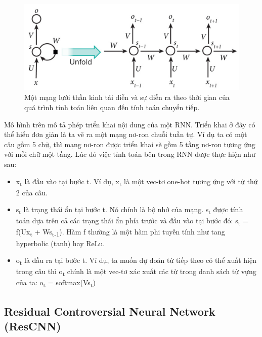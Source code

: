 \documentclass[conference]{IEEEtran}
\begin{document}
\begin{figure}[H]
    \centering
    \begin{minipage}{0.43\textwidth}
        \centering
        \includegraphics[width=1\textwidth]{bibliography/figure/RNN/RNN.pdf}
        \caption{Một mạng lưới thần kinh tái diễn và sự diễn ra theo thời gian của quá trình tính toán liên quan đến tính toán chuyển tiếp.}
        \label{fig:RNN}
    \end{minipage}

\end{figure}

Mô hình trên mô tả phép triển khai nội dung của một RNN. Triển khai ở đây có thể hiểu đơn giản là ta vẽ ra một mạng nơ-ron chuỗi tuần tự. Ví dụ ta có một câu gồm 5 chữ, thì mạng nơ-ron được triển khai sẽ gồm 5 tầng nơ-ron tương ứng với mỗi chữ một tầng. Lúc đó việc tính toán bên trong RNN được thực hiện như sau:
\begin{itemize}
    \item x\textsubscript{t} là đầu vào tại bước t. Ví dụ, x\textsubscript{t} là một vec-tơ one-hot tương ứng với từ thứ 2 của câu.
    \item s\textsubscript{t} là trạng thái ẩn tại bước t. Nó chính là bộ nhớ của mạng. s\textsubscript{t} được tính toán dựa trên cả các trạng thái ẩn phía trước và đầu vào tại bước đó: s\textsubscript{t} = f(Ux\textsubscript{t} +  Ws\textsubscript{t-1}). Hàm f thường là một hàm phi tuyến tính như tang hyperbolic (tanh) hay ReLu.
    \item o\textsubscript{t} là đầu ra tại bước t. Ví dụ, ta muốn dự đoán từ tiếp theo có thể xuất hiện trong câu thì o\textsubscript{t} chính là một vec-tơ xác xuất các từ trong danh sách từ vựng của ta: o\textsubscript{t} = softmax(Vs\textsubscript{t})
\end{itemize}


\subsection{Residual Controversial Neural Network (ResCNN)}
\end{document}
